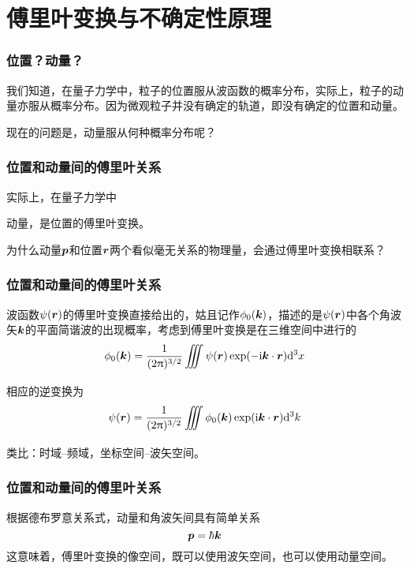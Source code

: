 \section{傅里叶变换与不确定性原理}

\begin{frame}
    \frametitle{位置？动量？}
    我们知道，在量子力学中，粒子的位置服从波函数的概率分布，实际上，粒子的动量亦服从概率分布。因为微观粒子并没有确定的轨道，即没有确定的位置和动量。

    现在的问题是，动量服从何种概率分布呢？
\end{frame}

\begin{frame}
    \frametitle{位置和动量间的傅里叶关系}
    实际上，在量子力学中
    \begin{center}
        动量，是位置的傅里叶变换。
    \end{center}

    为什么动量$\vb*{p}$和位置$\vb*{r}$两个看似毫无关系的物理量，会通过傅里叶变换相联系？
\end{frame}

\begin{frame}
    \frametitle{位置和动量间的傅里叶关系}
    波函数$\psi(\vb*{r})$的傅里叶变换直接给出的，姑且记作$\phi_0(\vb*{k})$，描述的是$\psi(\vb*{r})$中各个角波矢$\vb*{k}$的平面简谐波的出现概率，考虑到傅里叶变换是在三维空间中进行的
    \begin{equation}
        \phi_0(\vb*{k})=\frac{1}{(2\pi)^{3/2}}\Itnt\psi(\vb*{r})\exp(-\i\vb*{k}\cdot\vb*{r})\dd^3x
    \end{equation}
    相应的逆变换为
    \begin{equation}
        \psi(\vb*{r})=\frac{1}{(2\pi)^{3/2}}\Itnt\phi_0(\vb*{k})\exp(\i\vb*{k}\cdot\vb*{r})\dd^3k
    \end{equation}
    类比：时域--频域，坐标空间--波矢空间。
\end{frame}

\begin{frame}
    \frametitle{位置和动量间的傅里叶关系}
    根据德布罗意关系式，动量和角波矢间具有简单关系
    \begin{equation}
        \vb*{p}=\hbar\vb*{k}
    \end{equation}
    这意味着，傅里叶变换的像空间，既可以使用波矢空间，也可以使用动量空间。
\end{frame}

